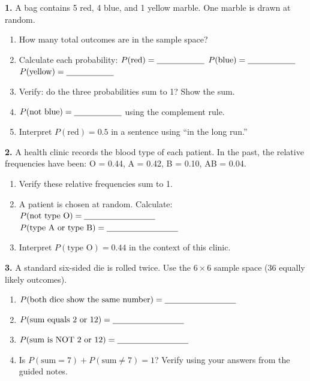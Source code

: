 \documentclass[10pt]{article}
\begin{document}
\namedateperiod

\vspace{0.1in}

\begin{practicebox}
\small

\textbf{1.} A bag contains 5 red, 4 blue, and 1 yellow marble. One marble is drawn
at random.

\begin{enumerate}[label=(\alph*), leftmargin=2em, itemsep=8pt]
  \item How many total outcomes are in the sample space? \blank{2cm}
  \item Calculate each probability:
        $P(\text{red}) = \blank{2cm}$ \qquad
        $P(\text{blue}) = \blank{2cm}$ \qquad
        $P(\text{yellow}) = \blank{2cm}$
  \item Verify: do the three probabilities sum to 1? Show the sum. \blank{4cm}
  \item $P(\text{not blue}) = \blank{2cm}$ using the complement rule.
  \item Interpret $P(\text{red}) = 0.5$ in a sentence using ``in the long run.''\\
        \writeline
\end{enumerate}

\vspace{8pt}
\textbf{2.} A health clinic records the blood type of each patient. In the past, the
relative frequencies have been: O = 0.44, A = 0.42, B = 0.10, AB = 0.04.

\begin{enumerate}[label=(\alph*), leftmargin=2em, itemsep=8pt]
  \item Verify these relative frequencies sum to 1. \blank{5cm}
  \item A patient is chosen at random. Calculate:
        $P(\text{not type O}) = \blank{3cm}$ \quad $P(\text{type A or type B}) = \blank{3cm}$
  \item Interpret $P(\text{type O}) = 0.44$ in the context of this clinic.\\
        \writeline\writeline
\end{enumerate}

\vspace{8pt}
\textbf{3.} A standard six-sided die is rolled twice. Use the $6 \times 6$ sample
space (36 equally likely outcomes).

\begin{enumerate}[label=(\alph*), leftmargin=2em, itemsep=8pt]
  \item $P(\text{both dice show the same number}) = \blank{3cm}$
  \item $P(\text{sum equals 2 or 12}) = \blank{3cm}$
  \item $P(\text{sum is NOT 2 or 12}) = \blank{3cm}$
  \item Is $P(\text{sum} = 7) + P(\text{sum} \ne 7) = 1$? Verify using your answers
        from the guided notes. \blank{5cm}
\end{enumerate}


\end{practicebox}
\end{document}
